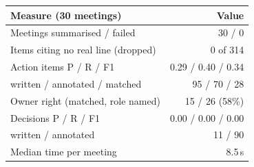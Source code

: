 \begin{tabular}{@{}lr@{}}
\toprule
Measure (30 meetings) & Value \\
\midrule
Meetings summarised / failed & 30 / 0 \\
Items citing no real line (dropped) & 0 of 314 \\
Action items P / R / F1 & 0.29 / 0.40 / 0.34 \\
\quad written / annotated / matched & 95 / 70 / 28 \\
Owner right (matched, role named) & 15 / 26 (58\%) \\
Decisions P / R / F1 & 0.00 / 0.00 / 0.00 \\
\quad written / annotated & 11 / 90 \\
Median time per meeting & 8.5\,s \\
\bottomrule
\end{tabular}
